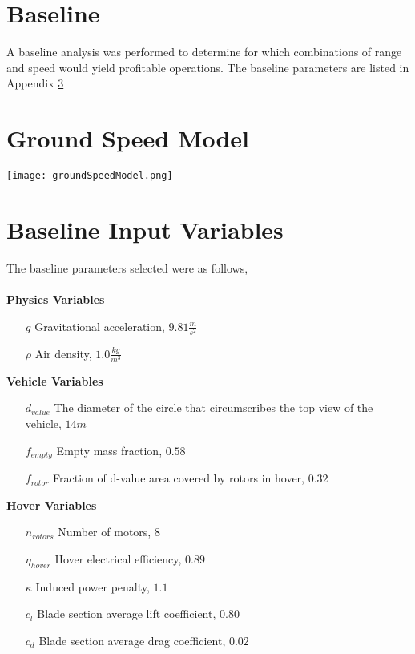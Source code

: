 \documentclass[12pt, letter]{article}
\begin{document}
\section{Baseline}
A baseline analysis was performed to determine for which combinations of range and speed would yield profitable operations. The baseline parameters are listed in Appendix \ref{APX:baseline}


\appendix
\section{Ground Speed Model} \label{APX:groundSpeed}
\texttt{[image: groundSpeedModel.png]}


\section{Baseline Input Variables} \label{APX:baseline}
The baseline parameters selected were as follows,\\\\
\textbf{Physics Variables}
\begin{itemize}
	\item[$g$] Gravitational acceleration, $9.81 \frac{m}{s^2}$
	\item[$\rho$] Air density, $1.0 \frac{kg}{m^3}$
	\item[]
\end{itemize}
\textbf{Vehicle Variables}
\begin{itemize}
	\item[$d_{value}$] The diameter of the circle that circumscribes the top view of the vehicle, $14 m$ 
	\item[$f_{empty}$] Empty mass fraction, $0.58$
	\item[$f_{rotor}$] Fraction of d-value area covered by rotors in hover, $0.32$
	\item[]
\end{itemize}
\textbf{Hover Variables}
\begin{itemize}
	\item[$n_{rotors}$] Number of motors, $8$
	\item[$\eta_{hover}$] Hover electrical efficiency, $0.89$
	\item[$\kappa$] Induced power penalty, $1.1$
	\item[$c_l$] Blade section average lift coefficient, $0.80$
	\item[$c_d$] Blade section average drag coefficient, $0.02$
	\item[]
\end{itemize}
\end{document}
